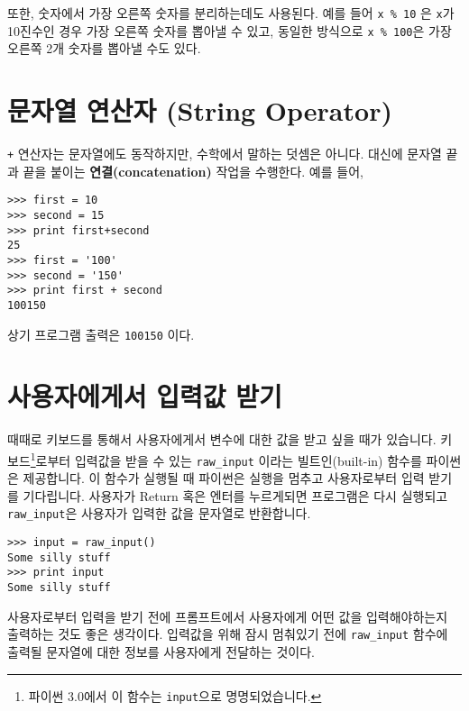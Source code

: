 
또한, 숫자에서 가장 오른쪽 숫자를 분리하는데도 사용된다. 
예를 들어 {\tt x \% 10} 은 {\tt x}가 10진수인 경우 가장 오른쪽 숫자를 뽑아낼 수 있고, 동일한 방식으로 {\tt x \% 100}은 가장 오른쪽 2개 숫자를 뽑아낼 수도 있다.

\section{문자열 연산자 (String Operator)}

{\tt +} 연산자는 문자열에도 동작하지만, 수학에서 말하는 덧셈은 아니다. 
대신에 문자열 끝과 끝을 붙이는 {\bf 연결(concatenation)} 작업을 수행한다. 예를 들어,


\beforeverb
\begin{verbatim}
>>> first = 10
>>> second = 15
>>> print first+second
25
>>> first = '100'
>>> second = '150'
>>> print first + second
100150
\end{verbatim}
\afterverb
%

상기 프로그램 출력은 {\tt 100150} 이다.

\section{사용자에게서 입력값 받기}


때때로 키보드를 통해서 사용자에게서 변수에 대한 값을 받고 싶을 때가 있습니다. 키보드\footnote{파이썬 3.0에서 이 함수는 {\tt input}으로 명명되었습니다.}로부터 입력값을 받을 수 있는 \verb"raw_input" 이라는 빌트인(built-in) 함수를 파이썬은 제공합니다. 이 함수가 실행될 때 파이썬은 실행을 멈추고 사용자로부터 입력 받기를 기다립니다. 사용자가 {\sf Return} 혹은 {\sf 엔터}를 누르게되면 프로그램은 다시 실행되고 \verb"raw_input"은 사용자가 입력한 값을 문자열로 반환합니다.


\beforeverb
\begin{verbatim}
>>> input = raw_input()
Some silly stuff
>>> print input
Some silly stuff
\end{verbatim}
\afterverb
%
사용자로부터 입력을 받기 전에 프롬프트에서 사용자에게 어떤 값을 입력해야하는지 출력하는 것도 좋은 생각이다. 입력값을 위해 잠시 멈춰있기 전에 \verb"raw_input" 함수에 출력될 문자열에 대한 정보를 사용자에게 전달하는 것이다.

